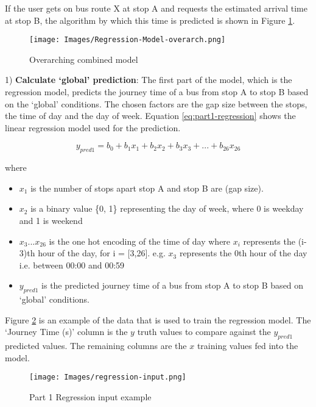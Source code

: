 If the user gets on bus route X at stop A and requests the estimated arrival time at stop B, the algorithm by which this time is predicted is shown in Figure \ref{fig:overarch-combined-model}. \\

\begin{figure}[H]
\begin{center}
    \texttt{[image: Images/Regression-Model-overarch.png]}
    \caption{Overarching combined model}
    \label{fig:overarch-combined-model}
\end{center}
\end{figure}

1) \textbf{Calculate `global' prediction}: The first part of the model, which is the regression model, predicts the journey time of a bus from stop A to stop B based on the `global' conditions. The chosen factors are the gap size between the stops, the time of day and the day of week. Equation \ref{eq:part1-regression} shows the linear regression model used for the prediction.

\begin{equation}
\label{eq:part1-regression}
    y_{pred1} = b_0 + b_1x_1 + b_2x_2 + b_3x_3 + ... + b_{26}x_{26}
\end{equation}

where 
\begin{itemize}
    \item $x_1$ is the number of stops apart stop A and stop B are (gap size).
    \item $x_2$ is a binary value \{0, 1\} representing the day of week, where 0 is weekday and 1 is weekend
    \item $x_3 ... x_{26}$ is the one hot encoding of the time of day where $x_i$ represents the (i-3)th hour of the day, for i = [3,26]. e.g. $x_3$ represents the 0th hour of the day i.e. between 00:00 and 00:59
    \item $y_{pred1}$ is the predicted journey time of a bus from stop A to stop B based on `global' conditions.
\end{itemize}

Figure \ref{fig:part1-regression-input} is an example of the data that is used to train the regression model. The `Journey Time (s)' column is the $y$ truth values to compare against the $y_{pred1}$ predicted values. The remaining columns are the $x$ training values fed into the model.

\begin{figure}[H]
\begin{center}
    \texttt{[image: Images/regression-input.png]}
    \caption{Part 1 Regression input example}
    \label{fig:part1-regression-input}
\end{center}
\end{figure}

